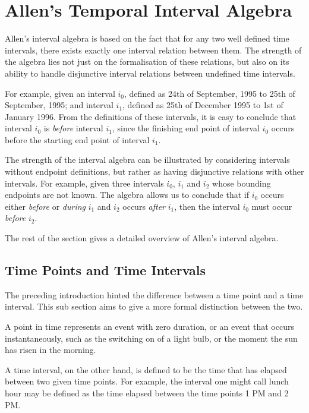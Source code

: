 \documentclass[11pt]{report}
\begin{document}
    \section{Allen's Temporal Interval Algebra}

      Allen's interval algebra is based on the fact that for any two well
      defined time intervals, there exists exactly one interval relation between
      them. The strength of the algebra lies not just on the formalisation of
      these relations, but also on its ability to handle disjunctive interval
      relations between undefined time intervals.

      For example, given an interval ${i_0}$, defined as 24th of September,
      1995 to 25th of September, 1995; and interval ${i_1}$, defined as 25th of
      December 1995 to 1st of January 1996. From the definitions of these
      intervals, it is easy to conclude that interval ${i_0}$ is {\em before}
      interval ${i_1}$, since the finishing end point of interval ${i_0}$
      occurs before the starting end point of interval ${i_1}$.

      The strength of the interval algebra can be illustrated by considering
      intervals without endpoint definitions, but rather as having disjunctive
      relations with other intervals. For example, given three intervals
      ${i_0}$, ${i_1}$ and ${i_2}$ whose bounding endpoints are not known. The
      algebra allows us to conclude that if ${i_0}$ occurs either {\em before}
      or {\em during} ${i_1}$ and ${i_2}$ occurs {\em after} ${i_1}$, then the
      interval ${i_0}$ must occur {\em before} ${i_2}$.

      The rest of the section gives a detailed overview of Allen's interval
      algebra.

      \subsection{Time Points and Time Intervals}

        The preceding introduction hinted the difference between a time point and a
        time interval. This sub section aims to give a more formal distinction between
        the two.

        A point in time represents an event with zero duration, or an event that occurs
        instantaneously, such as the switching on of a light bulb, or the moment the sun
        has risen in the morning.

        A time interval, on the other hand, is defined to be the time that has elapsed
        between two given time points. For example, the interval one might call lunch
        hour may be defined as the time elapsed between the time points 1 PM and 2 PM.
\end{document}
